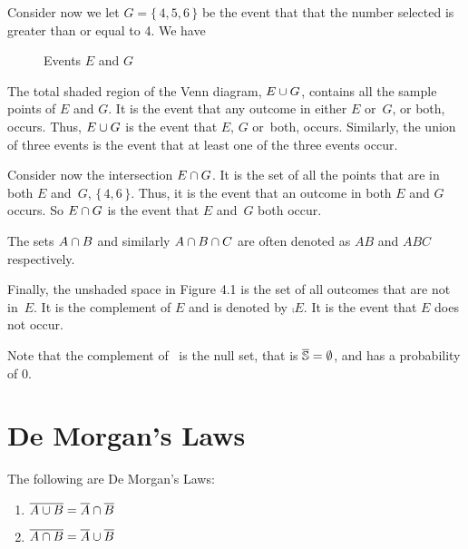 Consider now we let $G = \{\, 4,5,6 \,\}$ be the event that that the number selected is greater than or equal to 4. We have
\par\smallskip
\begin{figure}[h]
\centering
{}
\caption{Events $E$ and $G$} \label{fig:Events E and G}
\end{figure}
The total shaded region of the Venn diagram, $E \cup G$, contains all the sample points of $E$ and $G$. It is the event that any outcome in either $E$ or~$G$, or both, occurs. Thus, $E \cup G$ is the event that $E$, $G$ or~both, occurs. Similarly, the union of three events is the event that at least one of the three events occur.

Consider now the intersection $E \cap G$. It is the set of all the points that are in both $E$ and~$G$, $\{\, 4,6 \,\}$. Thus, it is the event that an outcome in both $E$ and $G$ occurs. So $E \cap G$ is the event that $E$ and~$G$ both occur. 
\begin{info}
The sets $A \cap B$ and similarly $A \cap B \cap C$ are often denoted as $AB$ and $ABC$ respectively.
\end{info}
Finally, the unshaded space in Figure 4.1 is the set of all outcomes that are not in~$E$. It is the complement of $E$ and is denoted by $\comp{E}$. It is the event that $E$ does not occur.
\begin{info}
Note that the complement of \sS~is the null set, that is $\overline{\mathbb{S}} = \emptyset$, and has a probability of 0.
\end{info}
\section{De Morgan's Laws}
\begin{theorem}
The following are De Morgan's Laws:
\begin{enumerate}
    \item $\overline{A \cup B} = \overline{A} \cap \overline{B}$
    \item $\overline{A \cap B} = \overline{A} \cup \overline{B}$
\end{enumerate}
\end{theorem}
